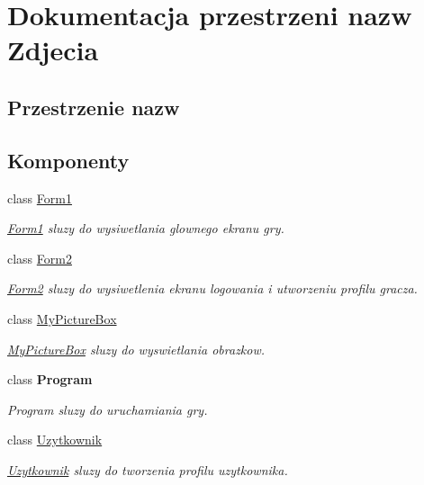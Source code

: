 \hypertarget{namespace_zdjecia}{}\section{Dokumentacja przestrzeni nazw Zdjecia}
\label{namespace_zdjecia}
\subsection*{Przestrzenie nazw}
\begin{DoxyCompactItemize}
\end{DoxyCompactItemize}
\subsection*{Komponenty}
\begin{DoxyCompactItemize}
\item 
class \hyperlink{class_zdjecia_1_1_form1}{Form1}
\begin{DoxyCompactList}\small\item\em \hyperlink{class_zdjecia_1_1_form1}{Form1} sluzy do wysiwetlania glownego ekranu gry. \end{DoxyCompactList}\item 
class \hyperlink{class_zdjecia_1_1_form2}{Form2}
\begin{DoxyCompactList}\small\item\em \hyperlink{class_zdjecia_1_1_form2}{Form2} sluzy do wysiwetlenia ekranu logowania i utworzeniu profilu gracza. \end{DoxyCompactList}\item 
class \hyperlink{class_zdjecia_1_1_my_picture_box}{My\+Picture\+Box}
\begin{DoxyCompactList}\small\item\em \hyperlink{class_zdjecia_1_1_my_picture_box}{My\+Picture\+Box} sluzy do wyswietlania obrazkow. \end{DoxyCompactList}\item 
class {\bfseries Program}
\begin{DoxyCompactList}\small\item\em Program sluzy do uruchamiania gry. \end{DoxyCompactList}\item 
class \hyperlink{class_zdjecia_1_1_uzytkownik}{Uzytkownik}
\begin{DoxyCompactList}\small\item\em \hyperlink{class_zdjecia_1_1_uzytkownik}{Uzytkownik} sluzy do tworzenia profilu uzytkownika. \end{DoxyCompactList}\end{DoxyCompactItemize}
